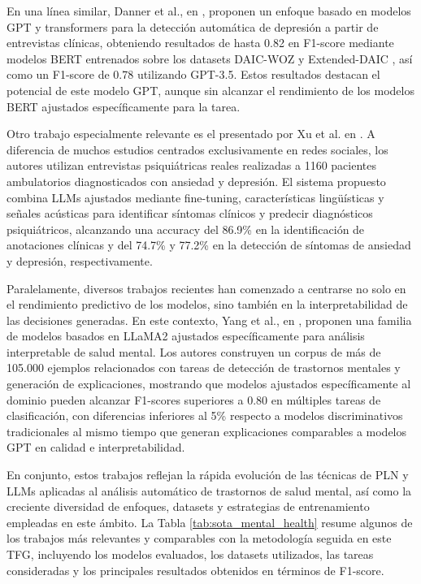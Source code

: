 En una línea similar, Danner et al., en \cite{danner_advancing_2023}, proponen un enfoque basado en modelos GPT y transformers para la detección automática de depresión a partir de entrevistas clínicas, obteniendo resultados de hasta 0.82 en F1-score mediante modelos BERT entrenados sobre los datasets DAIC-WOZ y Extended-DAIC \cite{gratch_distress_2014}, así como un F1-score de 0.78 utilizando GPT-3.5. Estos resultados destacan el potencial de este modelo GPT, aunque sin alcanzar el rendimiento de los modelos BERT ajustados específicamente para la tarea.

Otro trabajo especialmente relevante es el presentado por Xu et al. en \cite{xu_identifying_2025}. A diferencia de muchos estudios centrados exclusivamente en redes sociales, los autores utilizan entrevistas psiquiátricas reales realizadas a 1160 pacientes ambulatorios diagnosticados con ansiedad y depresión. El sistema propuesto combina LLMs ajustados mediante fine-tuning, características lingüísticas y señales acústicas para identificar síntomas clínicos y predecir diagnósticos psiquiátricos, alcanzando una accuracy del 86.9\% en la identificación de anotaciones clínicas y del 74.7\% y 77.2\% en la detección de síntomas de ansiedad y depresión, respectivamente.

Paralelamente, diversos trabajos recientes han comenzado a centrarse no solo en el rendimiento predictivo de los modelos, sino también en la interpretabilidad de las decisiones generadas. En este contexto, Yang et al., en \cite{yang_mentallama_2024}, proponen una familia de modelos basados en LLaMA2 ajustados específicamente para análisis interpretable de salud mental. Los autores construyen un corpus de más de 105.000 ejemplos relacionados con tareas de detección de trastornos mentales y generación de explicaciones, mostrando que modelos ajustados específicamente al dominio pueden alcanzar F1-scores superiores a 0.80 en múltiples tareas de clasificación, con diferencias inferiores al 5\% respecto a modelos discriminativos tradicionales al mismo tiempo que generan explicaciones comparables a modelos GPT en calidad e interpretabilidad.

En conjunto, estos trabajos reflejan la rápida evolución de las técnicas de \ac{PLN} y \acp{LLM} aplicadas al análisis automático de trastornos de salud mental, así como la creciente diversidad de enfoques, datasets y estrategias de entrenamiento empleadas en este ámbito. La Tabla \ref{tab:sota_mental_health} resume algunos de los trabajos más relevantes y comparables con la metodología seguida en este TFG, incluyendo los modelos evaluados, los datasets utilizados, las tareas consideradas y los principales resultados obtenidos en términos de F1-score.

